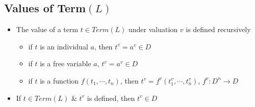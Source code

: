 \documentclass[11pt]{article}
\begin{document}
\subsection{Values of Term$(L)$}
\begin{itemize}
    \item The value of a term $t\in Term(L)$ under valuation $v$ is defined recursively 
    \begin{itemize}
        \item if $t$ is an individual $a$, then $t^v = a^v\in D$
        \item if $t$ is a free variable $a$, $t^v=a^v\in D$
        \item if $t$ is a function $f(t_1,\cdots,t_n)$, then $t^v = f^v(t_1^v,\cdots,t_n^v)$, $f^v: D^n\rightarrow D$
    \end{itemize}
    \item If $t\in Term(L)$ \& $t^v$ is defined, then $t^v\in D$
\end{itemize}
\end{document}

